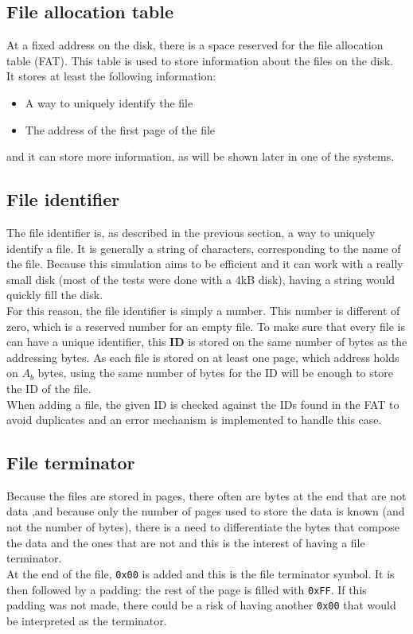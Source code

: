 \documentclass[10pt,a4paper]{ULBreport}
\begin{document}
\subsection{File allocation table}
At a fixed address on the disk, there is a space reserved for the file allocation table (FAT). This table is used to store information about the files on the disk. \\
It stores at least the following information:
\begin{itemize}
    \item A way to uniquely identify the file
    \item The address of the first page of the file
\end{itemize}
and it can store more information, as will be shown later in one of the systems.
\subsection{File identifier}
The file identifier is, as described in the previous section, a way to uniquely identify a file. It is generally a string of characters, corresponding to the name of the file. Because this simulation aims to be efficient and it can work with a really small disk (most of the tests were done with a 4kB disk), having a string would quickly fill the disk. \\
For this reason, the file identifier is simply a number. This number is different of zero, which is a reserved number for an empty file. To make sure that every file is can have a unique identifier, this \textbf{ID} is stored on the same number of bytes as the addressing bytes. As each file is stored on at least one page, which address holds on $A_b$ bytes, using the same number of bytes for the ID will be enough to store the ID of the file. \\
When adding a file, the given ID is checked against the IDs found in the FAT to avoid duplicates and an error mechanism is implemented to handle this case. 
\subsection{File terminator}
Because the files are stored in pages, there often are bytes at the end that are not data ,and because only the number of pages used to store the data is known (and not the number of bytes), there is a need to differentiate the bytes that compose the data and the ones that are not and this is the interest of having a file terminator. \\
At the end of the file, \texttt{0x00} is added and this is the file terminator symbol. It is then followed by a padding: the rest of the page is filled with \texttt{0xFF}. If this padding was not made, there could be a risk of having another \texttt{0x00} that would be interpreted as the terminator.
\end{document}
